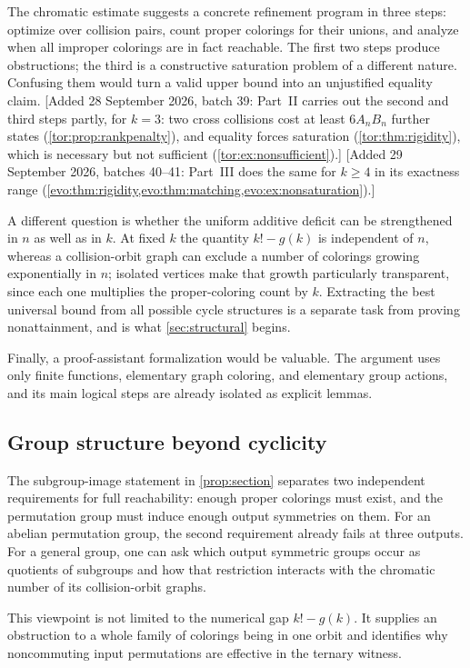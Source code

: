 \documentclass[11pt,a4paper]{article}
\numberwithin{equation}{section}
\theoremstyle{definition}
\theoremstyle{remark}
\begin{document}
The chromatic estimate suggests a concrete refinement program in three
steps: optimize over collision pairs, count proper colorings for their
unions, and analyze when all improper colorings are in fact reachable. The
first two steps produce obstructions; the third is a constructive saturation
problem of a different nature. Confusing them would turn a valid upper bound
into an unjustified equality claim.
[Added 28 September 2026, batch 39: Part~II carries out the second and third
steps partly, for $k=3$: two cross collisions cost at least $6A_nB_n$ further
states (\cref{tor:prop:rankpenalty}), and equality forces saturation
(\cref{tor:thm:rigidity}), which is necessary but not sufficient
(\cref{tor:ex:nonsufficient}).] [Added 29 September 2026, batches 40--41: Part~III does the same
for $k\ge4$ in its exactness range (\cref{evo:thm:rigidity,evo:thm:matching,evo:ex:nonsaturation}).]

A different question is whether the uniform additive deficit can be
strengthened in $n$ as well as in $k$. At fixed $k$ the quantity $k!-g(k)$ is
independent of $n$, whereas a collision-orbit graph can exclude a number of
colorings growing exponentially in $n$; isolated vertices make that growth
particularly transparent, since each one multiplies the proper-coloring count
by $k$. Extracting the best universal bound from all possible cycle
structures is a separate task from proving nonattainment, and is what
\cref{sec:structural} begins.

Finally, a proof-assistant formalization would be valuable. The argument uses
only finite functions, elementary graph coloring, and elementary group
actions, and its main logical steps are already isolated as explicit lemmas.

\subsection{Group structure beyond cyclicity}

The subgroup-image statement in \cref{prop:section} separates two independent
requirements for full reachability: enough proper colorings must exist, and
the permutation group must induce enough output symmetries on them. For an
abelian permutation group, the second requirement already fails at three
outputs. For a general group, one can ask which output symmetric groups
occur as quotients of subgroups and how that restriction interacts with the
chromatic number of its collision-orbit graphs.

This viewpoint is not limited to the numerical gap $k!-g(k)$. It supplies an
obstruction to a whole family of colorings being in one orbit and identifies
why noncommuting input permutations are effective in the ternary witness.
\end{document}
